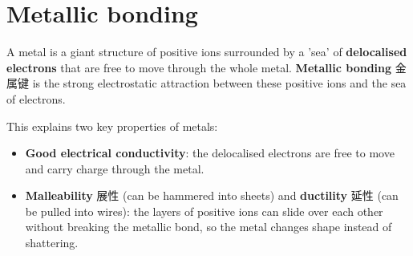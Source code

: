 \documentclass[11pt]{article}
\begin{document}
\section*{Metallic bonding}

A metal is a giant structure of positive ions surrounded by a 'sea' of \textbf{delocalised electrons} that are free to move through the whole metal. \textbf{Metallic bonding} 金属键 is the strong electrostatic attraction between these positive ions and the sea of electrons.

This explains two key properties of metals:

\begin{itemize}
\item \textbf{Good electrical conductivity}: the delocalised electrons are free to move and carry charge through the metal.

\item \textbf{Malleability} 展性 (can be hammered into sheets) and \textbf{ductility} 延性 (can be pulled into wires): the layers of positive ions can slide over each other without breaking the metallic bond, so the metal changes shape instead of shattering.

\end{itemize}
\end{document}
